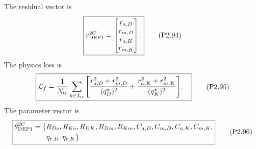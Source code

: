 \documentclass[11pt]{article}
\begin{document}
The residual vector is
\begin{align}
\boxed{r_{\rm DEP1}^{2C}=\begin{bmatrix}r_{a,D}\\r_{m,D}\\r_{a,K}\\r_{m,K}\end{bmatrix}.}
\tag{P2.94}
\end{align}
The physics loss is
\begin{align}
\boxed{\begin{aligned}
\mathcal L_f=\frac{1}{N_{\rm tr}}\sum_{k\in\mathcal I_{\rm tr}}\Bigg[&\frac{r_{a,D}^2+r_{m,D}^2}{(q_D^\star)^2}+\frac{r_{a,K}^2+r_{m,K}^2}{(q_K^\star)^2}\Bigg].
\end{aligned}}
\tag{P2.95}
\end{align}
The parameter vector is
\begin{align}
\boxed{\begin{aligned}
\theta_{\rm DEP1}^{2C}=\{&R_{Do},R_{Ko},R_{DK},R_{Dm},R_{Km},C_{a,D},C_{m,D},C_{a,K},C_{m,K},\\
&\eta_{r,D},\eta_{r,K}\}.
\end{aligned}}
\tag{P2.96}
\end{align}
\end{document}
